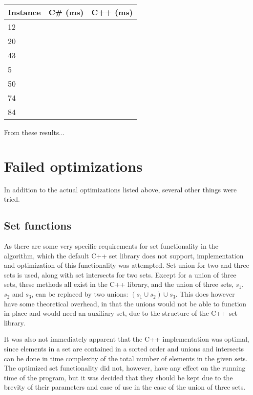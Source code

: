 \documentclass{article}
\begin{document}
		\begin{table}[!ht]
			\begin{tabular}{| l | r | r |}
			\hline
			Instance 	& C\# (ms)	& C++ (ms) 	\\ \hline
			12 			& 			& 			\\ \hline
			20 			& 			& 			\\ \hline
			43 			& 			& 			\\ \hline
			5  			& 			& 			\\ \hline 
			50 			& 			& 			\\ \hline 
			74 			& 			& 			\\ \hline 
			84 			& 			& 			\\ \hline 
			\end{tabular}
			\label{table:implementation-comparison}
		\end{table}

		From these results...

	\section{Failed optimizations}
	In addition to the actual optimizations listed above, several other things were tried.

		\subsection{Set functions}
		As there are some very specific requirements for set functionality in the algorithm, which the default C++ set library does not support, implementation and optimization of this functionality was attempted.
		Set union for two and three sets is used, along with set intersects for two sets.
		Except for a union of three sets, these methods all exist in the C++ library, and the union of three sets, $s_1$, $s_2$ and $s_3$, can be replaced by two unions: $(s_1 \cup s_2) \cup s_3$.
		This does however have some theoretical overhead, in that the unions would not be able to function in-place and would need an auxiliary set, due to the structure of the C++ set library.

		It was also not immediately apparent that the C++ implementation was optimal, since elements in a set are contained in a sorted order and unions and intersects can be done in time complexity of the total number of elements in the given sets.
		The optimized set functionality did not, however, have any effect on the running time of the program, but it was decided that they should be kept due to the brevity of their parameters and ease of use in the case of the union of three sets.
		
\end{document}
